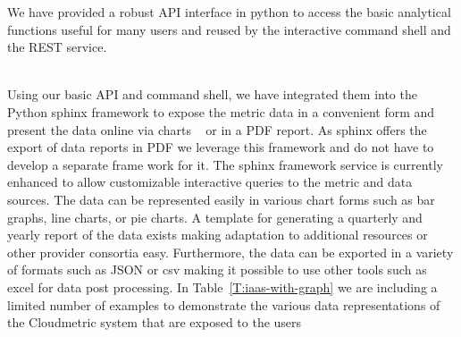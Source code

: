 \documentclass{tex/sig-alternate-2013}
\begin{document}
{\begin{description}[leftmargin=*,itemsep=0pt,topsep=0pt]
\item[Programming API.] We have provided a robust API interface
in python to access the basic  analytical functions useful for many
users and reused by the interactive command shell and the REST service.

\item[Graphical Representation and Printable Reports.] ~\\ Using our basic
  API and command shell, we have integrated them into the Python
  sphinx framework \cite{brandl2009sphinx} to expose the metric data
  in a convenient form and present the data online via charts
  ~\cite{highsoft2012highcharts} or in a PDF report. As sphinx offers
  the export of data reports in PDF we leverage this framework and do
  not have to develop a separate frame work for it. The sphinx
  framework service is currently enhanced to allow customizable
  interactive queries to the metric and data sources. The data can be
  represented easily in various chart forms such as bar graphs, line
  charts, or pie charts. A template for generating a quarterly and
  yearly report of the data exists making adaptation to additional
  resources or other provider consortia easy. Furthermore, the data
  can be exported in a variety of formats such as JSON or csv making
  it possible to use other tools such as excel for data post
  processing.  In Table~\ref{T:iaas-with-graph} we are including a
  limited number of examples to demonstrate the various data
  representations of the Cloudmetric system that are exposed to the
  users

\end{description}

}
\end{document}
